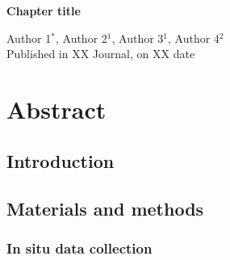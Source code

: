 \chapter[Chapter title]{}
\begin{center}
{\bf Chapter title}\\
\vspace{1cm}

Author 1\footnotemark${^*}$, Author 2${^1}$, Author 3${^1}$, Author 4${^2}$ \\

\vspace{1cm}
Published in XX Journal, on XX date \\


\end{center}




\newpage


\chapter*{ Abstract}


\newpage

\section{Introduction}



\section{Materials and methods}

\subsection{In situ data collection}








